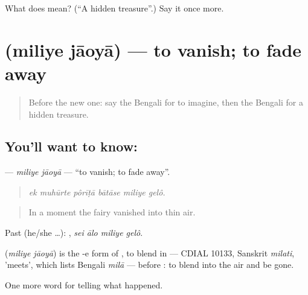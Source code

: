 \begin{tcolorbox}[breakable,colback=teal!4,colframe=teal!35!black,title={Before you move on}]
What does  mean? (\textquotedblleft{}A hidden treasure\textquotedblright{}.) Say it once more.
\end{tcolorbox}
\section[\texorpdfstring{\bn{মিলিয়ে} \bn{যাওয়া} (miliye jāoyā)}{মিলিয়ে যাওয়া (miliye jāoyā)}]{  (miliye jāoyā) — to vanish; to fade away}

\label{lesson:BN-C326-miliye-jaoya}



\begin{quote}
Before the new one: say the Bengali for to imagine, then the Bengali for a hidden treasure.
\end{quote}

\subsection*{You'll want to know:  }
\textbf{ } — \emph{miliye jāoyā} — \textquotedblleft{}to vanish; to fade away\textquotedblright{}.

\begin{quote}
     
\end{quote}

\begin{quote}
\emph{ek muhūrte pôrīṭā bātāse miliye gelô.}
\end{quote}

\begin{quote}
In a moment the fairy vanished into thin air.
\end{quote}

Past (he/she …):    , \emph{sei ālo miliye gelô}.

\begin{cousinweb}
\textbf{ } (\emph{miliye jāoyā}) is the -e form of , to blend in — CDIAL 10133, Sanskrit \emph{milati}, 'meets', which lists Bengali \emph{milā} — before \textbf{}: to blend into the air and be gone.
\end{cousinweb}

\begin{grammarlens}[title={What you've built}]
One more word for telling what happened.
\end{grammarlens}

